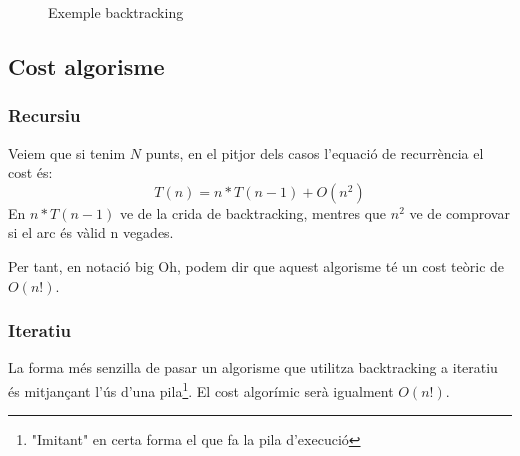 \documentclass[12pt, letterpaper]{article}
\begin{document}
\begin{figure}[htbp]
\begin{center}
\caption{Exemple backtracking}
\label{exemple:backtracking}
\end{center}
\end{figure}

\subsection{Cost algorisme}

\subsubsection{Recursiu}
Veiem que si tenim $N$ punts, en el pitjor dels casos l'equació de recurrència el cost és: 
\begin{equation}
    T(n) = n*T(n-1) + O(n^2)
\end{equation}
En $n * T(n-1)$ ve de la crida de backtracking, mentres que $n^2$ ve de comprovar si el arc és vàlid n vegades.

Per tant, en notació big Oh, podem dir que aquest algorisme té un cost teòric de $O(n!)$.

\subsubsection{Iteratiu}
La forma més senzilla de pasar un algorisme que utilitza backtracking a iteratiu és mitjançant l'ús d'una pila\footnote{"Imitant" en certa forma el que fa la pila d'execució}. El cost algorímic serà igualment $O(n!)$.
\end{document}
